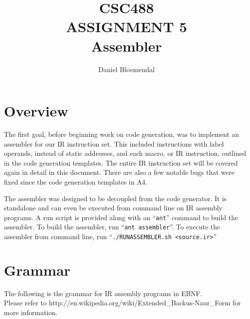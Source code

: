 \documentclass[oneside]{amsart}
\theoremstyle{definition}
\theoremstyle{remark}
\numberwithin{equation}{section}
\begin{document}
\title[CSC488 A5]{CSC488\\ASSIGNMENT 5\\Assembler}
\author{Daniel Bloemendal}

\begin{titlepage}
\maketitle
\thispagestyle{empty}
\tableofcontents
\end{titlepage}

\section{Overview}
The first goal, before beginning work on code generation, was to implement an assembler for our IR
instruction set. This included instructions with label operands, instead of static addresses, and
each macro, or IR instruction, outlined in the code generation templates. The entire IR instruction
set will be covered again in detail in this document. There are also a few notable bugs that were
fixed since the code generation templates in A4.

The assembler was designed to be decoupled from the code generator. It is standalone and can even be
executed from command line on IR assembly programs. A run script is provided along with an
``\texttt{ant}'' command to build the assembler. To build the assembler, run
``\texttt{ant assembler}''. To execute the assembler from command line, run
``\texttt{./RUNASSEMBLER.sh <source.ir>}''

\section{Grammar}
\noindent The following is the grammar for IR assembly programs in EBNF. \\
Please refer to http://en.wikipedia.org/wiki/Extended_Backus-Naur_Form for more information. \\
\end{document}
